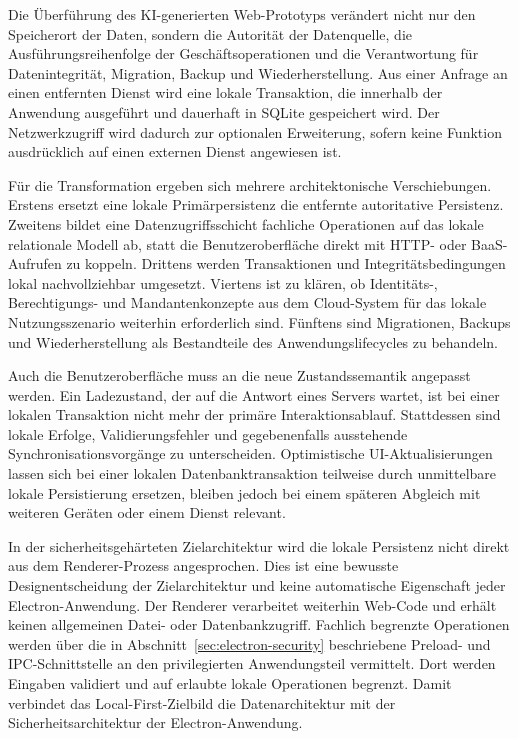 Die Überführung des KI-generierten Web-Prototyps verändert nicht nur den Speicherort der Daten, sondern die Autorität der Datenquelle, die Ausführungsreihenfolge der Geschäftsoperationen und die Verantwortung für Datenintegrität, Migration, Backup und Wiederherstellung.
Aus einer Anfrage an einen entfernten Dienst wird eine lokale Transaktion, die innerhalb der Anwendung ausgeführt und dauerhaft in SQLite gespeichert wird.
Der Netzwerkzugriff wird dadurch zur optionalen Erweiterung, sofern keine Funktion ausdrücklich auf einen externen Dienst angewiesen ist.

Für die Transformation ergeben sich mehrere architektonische Verschiebungen.
Erstens ersetzt eine lokale Primärpersistenz die entfernte autoritative Persistenz.
Zweitens bildet eine Datenzugriffsschicht fachliche Operationen auf das lokale relationale Modell ab, statt die Benutzeroberfläche direkt mit HTTP- oder BaaS-Aufrufen zu koppeln.
Drittens werden Transaktionen und Integritätsbedingungen lokal nachvollziehbar umgesetzt.
Viertens ist zu klären, ob Identitäts-, Berechtigungs- und Mandantenkonzepte aus dem Cloud-System für das lokale Nutzungsszenario weiterhin erforderlich sind.
Fünftens sind Migrationen, Backups und Wiederherstellung als Bestandteile des Anwendungslifecycles zu behandeln.

Auch die Benutzeroberfläche muss an die neue Zustandssemantik angepasst werden.
Ein Ladezustand, der auf die Antwort eines Servers wartet, ist bei einer lokalen Transaktion nicht mehr der primäre Interaktionsablauf.
Stattdessen sind lokale Erfolge, Validierungsfehler und gegebenenfalls ausstehende Synchronisationsvorgänge zu unterscheiden.
Optimistische UI-Aktualisierungen lassen sich bei einer lokalen Datenbanktransaktion teilweise durch unmittelbare lokale Persistierung ersetzen, bleiben jedoch bei einem späteren Abgleich mit weiteren Geräten oder einem Dienst relevant.

In der sicherheitsgehärteten Zielarchitektur wird die lokale Persistenz nicht direkt aus dem Renderer-Prozess angesprochen.
Dies ist eine bewusste Designentscheidung der Zielarchitektur und keine automatische Eigenschaft jeder Electron-Anwendung.
Der Renderer verarbeitet weiterhin Web-Code und erhält keinen allgemeinen Datei- oder Datenbankzugriff.
Fachlich begrenzte Operationen werden über die in Abschnitt~\ref{sec:electron-security} beschriebene Preload- und IPC-Schnittstelle an den privilegierten Anwendungsteil vermittelt.
Dort werden Eingaben validiert und auf erlaubte lokale Operationen begrenzt.
Damit verbindet das Local-First-Zielbild die Datenarchitektur mit der Sicherheitsarchitektur der Electron-Anwendung.

